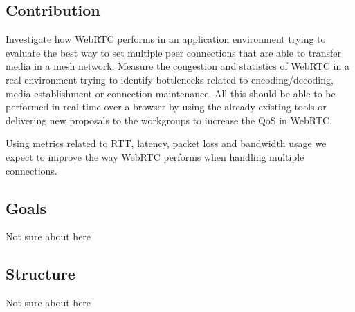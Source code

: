 \subsection{Contribution}

Investigate how WebRTC performs in an application environment trying to evaluate the best way to set multiple peer connections that are able to transfer media in a mesh network. Measure the congestion and statistics of WebRTC in a real environment trying to identify bottlenecks related to encoding/decoding, media establishment or connection maintenance. All this should be able to be performed in real-time over a browser by using the already existing tools or delivering new proposals to the workgroups to increase the QoS in WebRTC.

Using metrics related to RTT, latency, packet loss and bandwidth usage we expect to improve the way WebRTC performs when handling multiple connections.

\subsection{Goals}

Not sure about here

\subsection{Structure}

Not sure about here